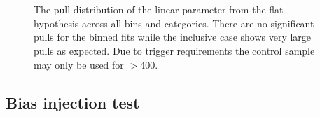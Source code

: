 \begin{figure}[h!]
  \centering
  ~~
  \\
  ~~
  \\
  \caption{\label{fig:frenchFlagPulls13} The pull distribution of the linear parameter from the flat hypothesis across all
  \scalht bins and categories. There are no significant pulls for the \scalht binned
  fits while the \scalht inclusive case shows very large pulls as expected. 
  Due to trigger requirements the \gj control sample may only be used for \scalht $> 400$\GeV.}
\end{figure}
\subsection{Bias injection test}

